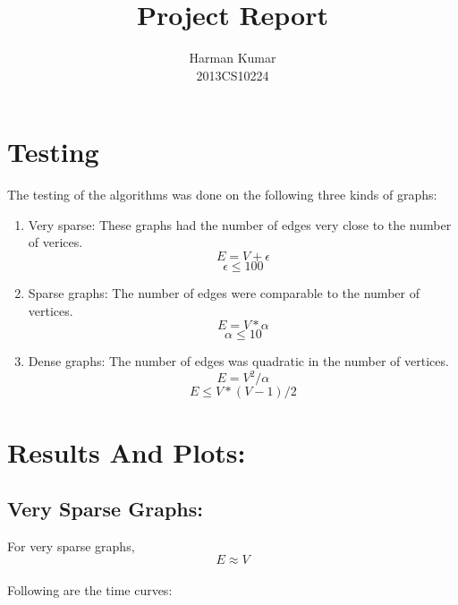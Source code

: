 \documentclass[]{article}
\begin{document}
\author{
		Harman Kumar\\
		2013CS10224		
		}

\title{Project Report}
\maketitle

\section{Testing}

\begin{flushleft}
	The testing of the algorithms was done on the following three kinds of graphs:
	\begin{enumerate}
	\item Very sparse: These graphs had the number of edges very close to the number of verices. \\
	\[ E = V + \epsilon\] \[\epsilon\leq100\] 
	
	\item Sparse graphs: The number of edges were comparable to the number of vertices.\\
	
	\[ E = V * \alpha\] \[\alpha\leq10\] 	
	
	\item Dense graphs: The number of edges was quadratic in the number of vertices.\\
	
	\[ E = V^2/ \alpha\] \[E \leq V*(V-1)/2\] 	
	
	\end{enumerate}
	
\end{flushleft}

\section{Results And Plots:}



\subsection{Very Sparse Graphs:}

	For very sparse graphs, \[ E \approx V\]\\
	Following are the time curves:
	
\end{document}
